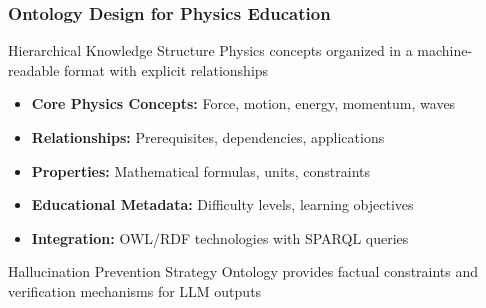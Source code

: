 \documentclass{beamer}
\begin{document}
\begin{frame}
\frametitle{Ontology Design for Physics Education}

\begin{alertblock}{Hierarchical Knowledge Structure}
Physics concepts organized in a machine-readable format with explicit relationships
\end{alertblock}

\begin{itemize}
    \item<1-> \textbf{Core Physics Concepts:} Force, motion, energy, momentum, waves
    \item<2-> \textbf{Relationships:} Prerequisites, dependencies, applications
    \item<3-> \textbf{Properties:} Mathematical formulas, units, constraints
    \item<4-> \textbf{Educational Metadata:} Difficulty levels, learning objectives
    \item<5-> \textbf{Integration:} OWL/RDF technologies with SPARQL queries
\end{itemize}

\begin{block}{Hallucination Prevention Strategy}
Ontology provides factual constraints and verification mechanisms for LLM outputs
\end{block}
\end{frame}
\end{document}
